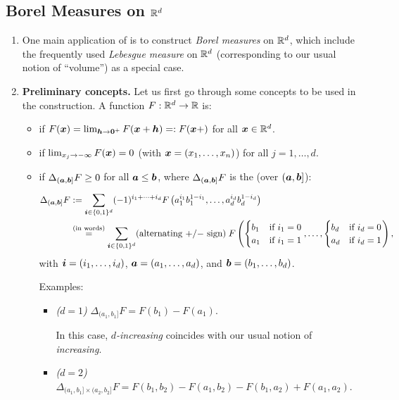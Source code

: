 \subsection{Borel Measures on \(\mathbb{R}^d\)}
\label{subsect:borel-meas-rd}
\begin{enumerate}
\item One main application of  is to construct
\emph{Borel measures} on \(\mathbb{R}^d\), which include the frequently used
\emph{Lebesgue measure} on \(\mathbb{R}^d\) (corresponding to our usual notion of
``volume'') as a special case.

\item \textbf{Preliminary concepts.} Let us first go through some concepts to
be used in the construction. A function \(F:\mathbb{R}^d\to\mathbb{R}\) is:
\begin{itemize}
\item {} if \(F(\bm{x})=\lim_{\bm{h}\to
\bm{0}^{+}}F(\bm{x}+\bm{h})=:F(\bm{x}+)\) for all \(\bm{x}\in\mathbb{R}^d\).
\item {} if \(\lim_{x_j\to -\infty}F(\bm{x})=0\) (with
\(\bm{x}=(x_1,\dotsc,x_n)\)) for all \(j=1,\dotsc,d\).
\item {} if \(\Delta_{(\bm{a},\bm{b}]}F\ge 0\) for all
\(\bm{a}\le\bm{b}\), where \(\Delta_{(\bm{a},\bm{b}]}F\) is the
 (over \((\bm{a},\bm{b}]\)):
\begin{align*}
\Delta_{(\bm{a},\bm{b}]}F&:=
\sum_{\bm{i}\in\{0,1\}^{d}}^{}(-1)^{i_{1}+\dotsb+i_{d}}
F\left(a_1^{i_1}b_1^{1-i_1},\dotsc,a_{d}^{i_d}b_{d}^{1-i_{d}}\right) \\
&\overset{\text{(in words)}}{=}
\sum_{\bm{i}\in\{0,1\}^{d}}^{}
(\text{alternating \(+\)/\(-\) sign})\;
F\left(
\begin{cases}
b_1&\text{if \(i_1=0\)} \\
a_1&\text{if \(i_1=1\)}
\end{cases}
,\dotsc,
\begin{cases}
b_d&\text{if \(i_d=0\)} \\
a_d&\text{if \(i_d=1\)}
\end{cases}
\right),
\end{align*}
with \(\bm{i}=(i_1,\dotsc,i_d)\), \(\bm{a}=(a_1,\dotsc,a_d)\), and
\(\bm{b}=(b_1,\dotsc,b_d)\).

Examples:
\begin{itemize}
\item \emph{(\(d=1\))} \(\Delta_{(a_1,b_1]}F=F(b_1)-F(a_1)\).
\begin{note}
In this case, \emph{\(d\)-increasing} coincides with our usual notion of \emph{increasing}.
\end{note}
\item \emph{(\(d=2\))} \(\Delta_{(a_1,b_1]\times (a_2,b_2]}F
=F(b_1,b_2)-F(a_1,b_2)-F(b_1,a_2)+F(a_1,a_2)\).


\end{itemize}
\end{itemize}
\end{enumerate}
